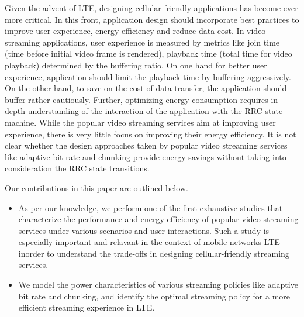 Given the advent of LTE, designing cellular-friendly applications has become ever more critical. In this front, application design should incorporate best practices to improve user experience, energy efficiency and reduce data cost. In video streaming applications, user experience is measured by metrics like join time (time before initial video frame is rendered), playback time (total time for video playback) determined by the buffering ratio. On one hand for better user experience, application should limit the playback time by buffering aggressively. On the other hand, to save on the cost of data transfer, the application should buffer rather cautiously. Further, optimizing energy consumption requires in-depth understanding of the interaction of the application with the RRC state machine. While the popular video streaming services aim at improving user experience, there is very little focus on improving their energy efficiency. It is not clear whether the design approaches taken by popular video streaming services like adaptive bit rate and chunking provide energy savings without taking into consideration the RRC state transitions.           

Our contributions in this paper are outlined below.
\begin{itemize}
\item As per our knowledge, we perform one of the first exhaustive studies that characterize the performance and energy efficiency of popular video streaming services under various scenarios and user interactions.
Such a study is especially important and relavant in the context of mobile networks LTE inorder to understand the trade-offs in designing cellular-friendly streaming services. 
\item We model the power characteristics of various streaming policies like adaptive bit rate and chunking, and identify the optimal streaming policy for a more efficient streaming experience in LTE. 
\end{itemize}
